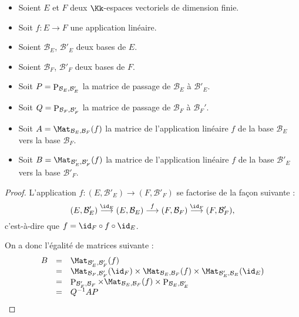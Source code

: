 \documentclass[class=report,crop=false]{standalone}
\begin{document}
\begin{itemize}
  \item Soient $E$ et $F$ deux $\Kk$-espaces vectoriels de dimension finie.

  \item Soit $f : E \to F$ une application linéaire.

  \item Soient $\mathcal{B}_E$, $\mathcal{B}'_E$ deux bases de $E$.

  \item Soient $\mathcal{B}_F$, $\mathcal{B}'_F$ deux bases de $F$.

  \item Soit $P = \mathop{\mathrm{P}}\nolimits_{\mathcal{B}_E,\mathcal{B}'_E}$ la matrice de passage de $\mathcal{B}_E$
  à $\mathcal{B}'_E$.

  \item Soit $Q = \mathop{\mathrm{P}}\nolimits_{\mathcal{B}_F,\mathcal{B}'_F}$ la matrice de passage de $\mathcal{B}_F$
  à $\mathcal{B}_F'$.

  \item Soit $A = \Mat_{\mathcal{B}_E,\mathcal{B}_F} (f)$ la matrice de l'application linéaire $f$ de la base
  $\mathcal{B}_E$ vers la base $\mathcal{B}_F$.

  \item Soit $B = \Mat_{\mathcal{B}'_E,\mathcal{B}'_F} (f)$ la matrice de l'application linéaire $f$ de la base
  $\mathcal{B}'_E$ vers la base $\mathcal{B}'_F$.
\end{itemize}


\begin{theoreme}
\label{th:changementbase}
\sauteligne
{}
\end{theoreme}

\begin{proof}
L'application $f : (E,\mathcal{B}'_E) \to (F, \mathcal{B}'_F)$ se factorise de la
façon suivante :
$$(E,\mathcal{B}'_E)
\stackrel{\id_E}{\longrightarrow} (E, \mathcal{B}_E)
\stackrel{f}{\longrightarrow} (F, \mathcal{B}_F)
\stackrel{\id_F}{\longrightarrow} (F, \mathcal{B}'_{F}),$$
c'est-à-dire que $f = \id_F \circ f \circ \id_E$.


On a donc l'égalité de matrices suivante :
$$\begin{array}{rcl}
B
& = & \Mat_{\mathcal{B}'_E,\mathcal{B}'_F} (f) \\
& = & \Mat_{\mathcal{B}_F,\mathcal{B}'_F} (\id_F) \times \Mat_{\mathcal{B}_E,\mathcal{B}_F} (f)
\times \Mat_{\mathcal{B}'_E,\mathcal{B}_E} (\id_E) \\
& = & \Pass_{\mathcal{B}'_F,\mathcal{B}_F} \times \Mat_{\mathcal{B}_E,\mathcal{B}_F} (f)
\times \Pass_{\mathcal{B}_E,\mathcal{B}'_E} \\
& = & Q^{-1} A P
\end{array}$$
\end{proof}
\end{document}
